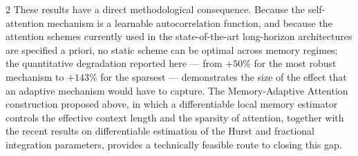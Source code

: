 \documentclass[a4paper,10pt,twoside]{article}
\begin{document}
\begin{multicols}{2}
These results have a direct methodological consequence. Because the self-attention mechanism is a
learnable autocorrelation function, and because the attention schemes currently used in the
state-of-the-art long-horizon architectures are specified a priori, no static scheme can be optimal
across memory regimes; the quantitative degradation reported here --- from $+50\%$ for the
most robust mechanism to $+143\%$ for the sparsest --- demonstrates the size of the effect that an
adaptive mechanism would have to capture. The Memory-Adaptive Attention construction proposed
above, in which a differentiable local memory estimator controls the effective context length and
the sparsity of attention, together with the recent results on differentiable estimation of the
Hurst and fractional integration parameters, provides a technically feasible route to closing this
gap.


\end{multicols}
\end{document}
